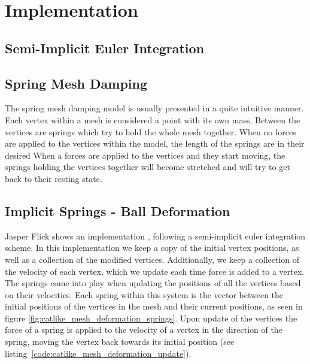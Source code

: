 \chapter{Implementation}
\label{chap:implementation}

\section{Semi-Implicit Euler Integration}

\section{Spring Mesh Damping}
The spring mesh damping model is usually presented in a quite intuitive manner. 
Each vertex within a mesh is considered a point with its own mass. 
Between the vertices are springs which try to hold the whole mesh together.
When no forces are applied to the vertices within the model, the length of the springs are in their desired 
When a forces are applied to the vertices and they start moving, the springs holding the vertices together will become stretched
and will try to get back to their resting state.


\section{Implicit Springs - Ball Deformation}
Jasper Flick\cite{catlike_mesh_deformation} shows an implementation , following a semi-implicit euler integration scheme. 
In this implementation we keep a copy of the initial vertex positions, as well as a collection of the modified vertices.
Additionally, we keep a collection of the velocity of each vertex, which we update each time force is added to a vertex.
The springs come into play when updating the positions of all the vertices based on their velocities.
Each spring within this system is the vector between the initial positions of the vertices in the mesh and their current positions, as seen in figure \ref{fig:catlike_mesh_deformation_springs}.
Upon update of the vertices the force of a spring is applied to the velocity of a vertex in the direction of the spring, moving the vertex back towards its initial position (see listing~\ref{code:catlike_mesh_deformation_update}).

